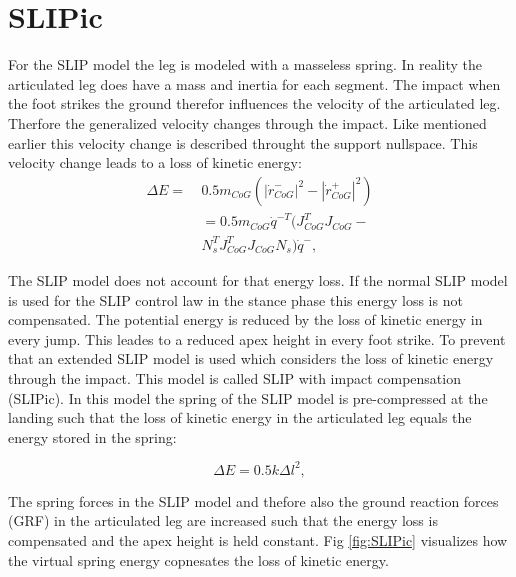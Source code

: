 \documentclass[10pt, conference]{IEEEtran}
\begin{document}
\section{SLIPic}
\label{sec:SLIPic}
For the SLIP model the leg is modeled with a masseless spring. In reality the articulated leg does have a mass and inertia for each segment. The impact when the foot strikes the ground 
therefor influences the velocity of the articulated leg. Therfore the generalized velocity changes through the impact. Like mentioned earlier this velocity change is described throught 
the support nullspace. This velocity change leads to a loss of kinetic energy:
\begin{equation}
\begin{aligned}
   \Delta E = & \ 0.5 {m}_{CoG} ({|{\dot{r}}_{CoG}^{-}|}^{2} - {|{\dot{r}}_{CoG}^{+}|}^{2}) \\
   & \ =0.5 {m}_{CoG} {\dot{q}}^{-T} ({J}_{CoG}^{T} {J}_{CoG} - \\
   & \ {N}_{s}^{T} {J}_{CoG}^{T} {J}_{CoG} {N}_{s}) {\dot{q}}^{-},
\end{aligned}
\end{equation}

The SLIP model does not account for that energy loss. If the normal SLIP model is used for the SLIP 
control law in the stance phase this energy loss is not compensated. The potential energy is reduced by the loss of kinetic energy in every jump. This leades to a reduced apex height 
in every foot strike. To prevent that an extended SLIP model is used which considers the loss of kinetic energy through the impact. This model is called SLIP with impact compensation 
(SLIPic). In this model the spring of the SLIP model is pre-compressed at the landing such that the loss of kinetic energy in the articulated leg equals the energy stored in the spring: 

\begin{equation}
   \Delta E = 0.5 k {\Delta l}^{2},
\end{equation}

The spring forces in the SLIP model and thefore also the ground reaction forces (GRF) in the articulated leg are increased such that the energy loss is compensated and the apex height is 
held constant. Fig \ref{fig:SLIPic} visualizes how the virtual spring energy copnesates the loss of kinetic energy.
\end{document}
